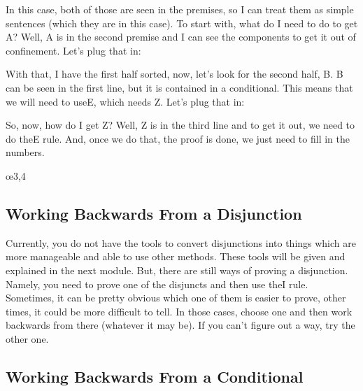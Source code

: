 In this case, both of those are seen in the premises, so I can treat them as simple sentences (which they are in this case). To start with, what do I need to do to get A? Well, A is in the second premise and I can see the components to get it out of confinement. Let's plug that in:
\begin{fitchproof}
\ellipsesline
{}
\end{fitchproof}

With that, I have the first half sorted, now, let's look for the second half, B. B can be seen in the first line, but it is contained in a conditional. This means that we will need to use\eif E, which needs Z. Let's plug that in:
\begin{fitchproof}
\ellipsesline
{}
\end{fitchproof}


So, now, how do I get Z? Well, Z is in the third line and to get it out, we need to do the\eor E rule. And, once we do that, the proof is done, we just need to fill in the numbers.
\begin{fitchproof}
\oe{3,4}
\end{fitchproof}

\subsection{Working Backwards From a Disjunction}

Currently, you do not have the tools to convert disjunctions into things which are more manageable and able to use other methods. These tools will be given and explained in the next module. But, there are still ways of proving a disjunction. Namely, you need to prove one of the disjuncts and then use the\eor I rule. Sometimes, it can be pretty obvious which one of them is easier to prove, other times, it could be more difficult to tell. In those cases, choose one and then work backwards from there (whatever it may be). If you can't figure out a way, try the other one. 

\subsection{Working Backwards From a Conditional}

